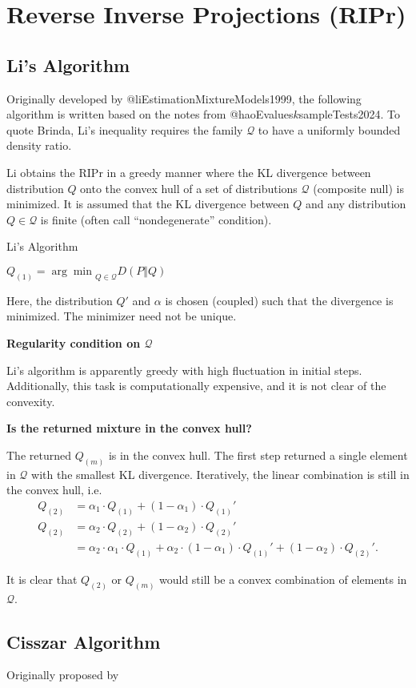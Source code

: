 \clearpage

\section{Reverse Inverse Projections (RIPr)}

\subsection{Li's Algorithm}

Originally developed by @liEstimationMixtureModels1999,
the following algorithm is written based on the notes from \cite{grunwaldSafeTesting2024}
@haoEvalues$k$sampleTests2024. 
To quote Brinda, Li's inequality requires the family $\mathcal{Q}$ to have a
uniformly bounded density ratio.

Li obtains the RIPr in a greedy manner where the KL divergence between
distribution $Q$ onto the convex hull of a set of distributions $\mathcal{Q}$
(composite null) is minimized. It is assumed that the KL divergence between $Q$
and any distribution $Q \in \mathcal{Q}$ is finite 
(often call ``nondegenerate'' condition).

\begin{algorithm}
    \DontPrintSemicolon
    \caption{Li's Algorithm}
    \BlankLine
    $Q_{(1)} = {\arg\min}_{Q \in \mathcal{Q}} D(P \Vert Q)$\;
\end{algorithm}

Here, the distribution $Q'$ and $\alpha$ is chosen (coupled) such that the divergence is minimized. 
The minimizer need not be unique.

\textbf{Regularity condition on $\mathcal{Q}$}

Li's algorithm is apparently greedy with high fluctuation in initial steps. 
Additionally, this task is computationally expensive, and it is not clear of the convexity.

\textbf{Is the returned mixture in the convex hull?}

The returned $Q_{(m)}$ is in the convex hull. 
The first step returned a single element in $\mathcal{Q}$ with the smallest KL divergence.
Iteratively, the linear combination is still in the convex hull, i.e.
\begin{align*}
    Q_{(2)} & = \alpha_1 \cdot Q_{(1)} + (1 - \alpha_1)\cdot Q_{(1)}' \\
    Q_{(2)} & = \alpha_2 \cdot Q_{(2)} + (1 - \alpha_2)\cdot Q_{(2)}' \\
            & = \alpha_2 \cdot \alpha_1 \cdot Q_{(1)} +
    \alpha_2 \cdot (1 - \alpha_1) \cdot Q_{(1)}' +
    (1 - \alpha_2)\cdot Q_{(2)}'.
\end{align*}

It is clear that $Q_{(2)}$ or $Q_{(m)}$ would still be a convex combination of
elements in $\mathcal{Q}$.


\subsection{Cisszar Algorithm}

Originally proposed by